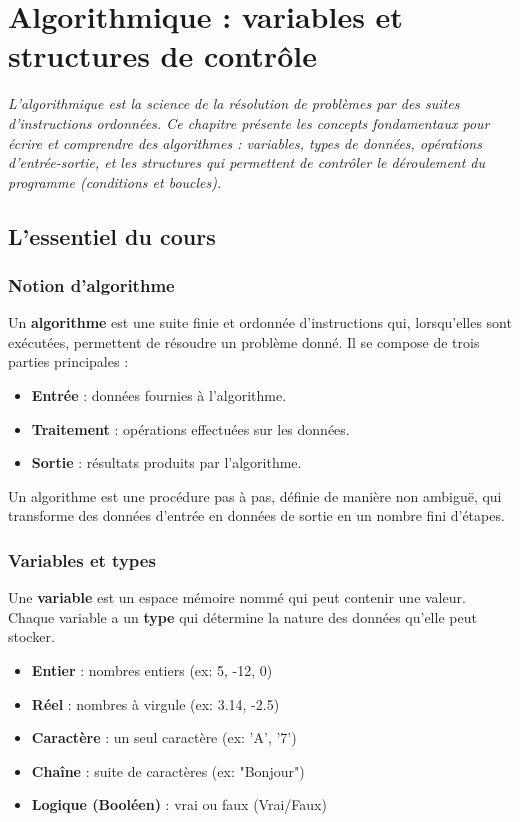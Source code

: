\chapter{Algorithmique : variables et structures de contrôle}

\textit{L'algorithmique est la science de la résolution de problèmes par des suites d'instructions ordonnées. Ce chapitre présente les concepts fondamentaux pour écrire et comprendre des algorithmes : variables, types de données, opérations d'entrée-sortie, et les structures qui permettent de contrôler le déroulement du programme (conditions et boucles).}

\section{L'essentiel du cours}

\subsection{Notion d'algorithme}
Un \textbf{algorithme} est une suite finie et ordonnée d'instructions qui, lorsqu'elles sont exécutées, permettent de résoudre un problème donné. Il se compose de trois parties principales :
\begin{itemize}
    \item \textbf{Entrée} : données fournies à l'algorithme.
    \item \textbf{Traitement} : opérations effectuées sur les données.
    \item \textbf{Sortie} : résultats produits par l'algorithme.
\end{itemize}

\begin{definition}[Algorithme]
Un algorithme est une procédure pas à pas, définie de manière non ambiguë, qui transforme des données d'entrée en données de sortie en un nombre fini d'étapes.
\end{definition}

\subsection{Variables et types}
Une \textbf{variable} est un espace mémoire nommé qui peut contenir une valeur. Chaque variable a un \textbf{type} qui détermine la nature des données qu'elle peut stocker.

\begin{propriete}
\begin{itemize}
    \item \textbf{Entier} : nombres entiers (ex: 5, -12, 0)
    \item \textbf{Réel} : nombres à virgule (ex: 3.14, -2.5)
    \item \textbf{Caractère} : un seul caractère (ex: 'A', '7')
    \item \textbf{Chaîne} : suite de caractères (ex: "Bonjour")
    \item \textbf{Logique (Booléen)} : vrai ou faux (Vrai/Faux)
\end{itemize}
\end{propriete}


